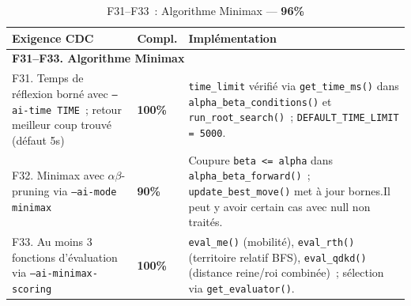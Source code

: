 \documentclass[a4paper]{article}
\begin{document}
 
\begin{table}[H]
\centering
\renewcommand{\arraystretch}{1.4}
\begin{tabular}{|p{6cm}|p{1.5cm}|p{8cm}|}
\hline
\textbf{Exigence CDC} & \textbf{Compl.} & \textbf{Implémentation} \\
\hline
\multicolumn{3}{|l|}{\textbf{F31--F33. Algorithme Minimax}} \\
\hline
F31. Temps de réflexion borné avec \texttt{--ai-time TIME}~; retour meilleur coup trouvé (défaut 5s)
& \textbf{100\%}
& \texttt{time\_limit} vérifié via \texttt{get\_time\_ms()} dans \texttt{alpha\_beta\_conditions()} et \texttt{run\_root\_search()}~; \texttt{DEFAULT\_TIME\_LIMIT = 5000}. \\
\hline
F32. Minimax avec $\alpha\beta$-pruning via \texttt{--ai-mode minimax}
& \textbf{90\%}
& Coupure \texttt{beta <= alpha} dans \texttt{alpha\_beta\_forward()}~; \texttt{update\_best\_move()} met à jour bornes.Il peut y avoir certain cas avec null non traités. \\
\hline
F33. Au moins 3 fonctions d'évaluation via \texttt{--ai-minimax-scoring}
& \textbf{100\%}
& \texttt{eval\_me()} (mobilité), \texttt{eval\_rth()} (territoire relatif BFS), \texttt{eval\_qdkd()} (distance reine/roi combinée)~; sélection via \texttt{get\_evaluator()}. \\
\hline
\end{tabular}
\caption{F31--F33~: Algorithme Minimax --- \textbf{96\%}}
\label{tab:f31-f33}
\end{table}
 
 
\end{document}
